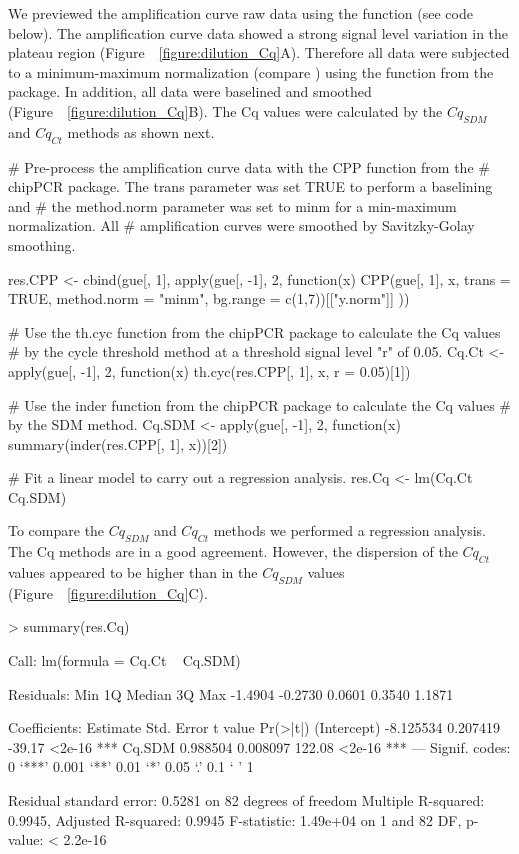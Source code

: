 We previewed the amplification curve raw data using the  
function (see code below). The amplification curve data showed a strong signal 
level variation in the plateau region (Figure~~\ref{figure:dilution_Cq}A). 
Therefore all data were subjected to a minimum-maximum normalization (compare 
\citet{roediger_RJ_2013}) using the  function from the 
 package. In addition, all data were baselined and smoothed 
(Figure~~\ref{figure:dilution_Cq}B). The Cq values were calculated by the 
$Cq_{SDM}$ and $Cq_{Ct}$ methods as shown next.

\begin{example}
# Pre-process the amplification curve data with the CPP function from the 
# chipPCR package. The trans parameter was set TRUE to perform a baselining and 
# the method.norm parameter was set to minm for a min-maximum normalization. All
# amplification curves were smoothed by Savitzky-Golay smoothing.

res.CPP <- cbind(gue[, 1], apply(gue[, -1], 2, function(x) {
  CPP(gue[, 1], x, trans = TRUE, method.norm = "minm", 
      bg.range = c(1,7))[["y.norm"]]
}))

# Use the th.cyc function from the chipPCR package to calculate the Cq values
# by the cycle threshold method at a threshold signal level "r" of 0.05.
Cq.Ct <- apply(gue[, -1], 2, function(x) 
  th.cyc(res.CPP[, 1], x, r = 0.05)[1])

# Use the inder function from the chipPCR package to calculate the Cq values
# by the SDM method.
Cq.SDM <- apply(gue[, -1], 2, function(x)
  summary(inder(res.CPP[, 1], x))[2])

# Fit a linear model to carry out a regression analysis.
res.Cq <- lm(Cq.Ct ~ Cq.SDM)
\end{example}

To compare the $Cq_{SDM}$ and $Cq_{Ct}$ methods we performed a regression 
analysis. The Cq methods are in a good agreement. However, the dispersion of the 
$Cq_{Ct}$ values appeared to be higher than in the $Cq_{SDM}$ values 
(Figure~~\ref{figure:dilution_Cq}C).

\begin{example}
> summary(res.Cq)

Call:
lm(formula = Cq.Ct ~ Cq.SDM)

Residuals:
    Min      1Q  Median      3Q     Max 
-1.4904 -0.2730  0.0601  0.3540  1.1871 

Coefficients:
             Estimate Std. Error t value Pr(>|t|)    
(Intercept) -8.125534   0.207419  -39.17   <2e-16 ***
Cq.SDM       0.988504   0.008097  122.08   <2e-16 ***
---
Signif. codes:  0 ‘***’ 0.001 ‘**’ 0.01 ‘*’ 0.05 ‘.’ 0.1 ‘ ’ 1

Residual standard error: 0.5281 on 82 degrees of freedom
Multiple R-squared:  0.9945,	Adjusted R-squared:  0.9945 
F-statistic: 1.49e+04 on 1 and 82 DF,  p-value: < 2.2e-16
\end{example}


